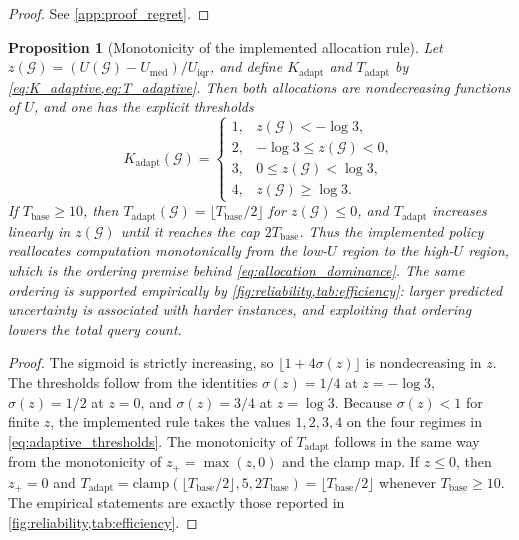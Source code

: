 \documentclass[aps,prx,reprint,superscriptaddress,longbibliography]{revtex4-2}
\newcommand{\calG}{\mathcal{G}}
\newtheorem{proposition}[theorem]{Proposition}
\begin{document}
\begin{proof}
See \cref{app:proof_regret}.
\end{proof}

\begin{proposition}[Monotonicity of the implemented allocation rule]
\label{prop:allocation_support}
Let
$z(\calG) = (U(\calG)-U_{\mathrm{med}})/U_{\mathrm{iqr}}$, and define
$K_{\mathrm{adapt}}$ and $T_{\mathrm{adapt}}$ by
\cref{eq:K_adaptive,eq:T_adaptive}. Then both allocations are
nondecreasing functions of $U$, and one has the explicit thresholds
\begin{equation}
    K_{\mathrm{adapt}}(\calG) =
    \begin{cases}
        1, & z(\calG) < -\log 3, \\
        2, & -\log 3 \le z(\calG) < 0, \\
        3, & 0 \le z(\calG) < \log 3, \\
        4, & z(\calG) \ge \log 3.
    \end{cases}
    \label{eq:adaptive_thresholds}
\end{equation}
If $T_{\mathrm{base}} \ge 10$, then
$T_{\mathrm{adapt}}(\calG)=\lfloor T_{\mathrm{base}}/2\rfloor$ for
$z(\calG) \le 0$, and $T_{\mathrm{adapt}}$ increases linearly in
$z(\calG)$ until it reaches the cap $2T_{\mathrm{base}}$.
Thus the implemented policy reallocates computation monotonically from
the low-$U$ region to the high-$U$ region, which is the ordering premise
behind \cref{eq:allocation_dominance}. The same ordering is supported
empirically by \cref{fig:reliability,tab:efficiency}: larger predicted
uncertainty is associated with harder instances, and exploiting that
ordering lowers the total query count.
\end{proposition}

\begin{proof}
The sigmoid is strictly increasing, so
$\lfloor 1+4\sigma(z)\rfloor$ is nondecreasing in $z$.
The thresholds follow from the identities
$\sigma(z)=1/4$ at $z=-\log 3$,
$\sigma(z)=1/2$ at $z=0$, and
$\sigma(z)=3/4$ at $z=\log 3$.
Because $\sigma(z) < 1$ for finite $z$, the implemented rule takes the
values $1,2,3,4$ on the four regimes in
\cref{eq:adaptive_thresholds}. The monotonicity of
$T_{\mathrm{adapt}}$ follows in the same way from the monotonicity of
$z_+ = \max(z,0)$ and the clamp map. If $z \le 0$, then
$z_+=0$ and
$T_{\mathrm{adapt}} = \mathrm{clamp}(\lfloor T_{\mathrm{base}}/2\rfloor,
5,2T_{\mathrm{base}}) = \lfloor T_{\mathrm{base}}/2\rfloor$
whenever $T_{\mathrm{base}} \ge 10$.
The empirical statements are exactly those reported in
\cref{fig:reliability,tab:efficiency}.
\end{proof}
\end{document}

